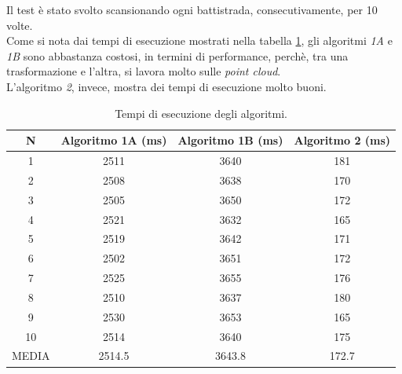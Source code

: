 \noindent Il test è stato svolto scansionando ogni battistrada, consecutivamente, per 10 volte.\\
\newline
Come si nota dai tempi di esecuzione mostrati nella tabella  \ref{table:tempo_algoritmi}, gli algoritmi \textit{1A} e \textit{1B} sono abbastanza costosi, in termini di performance, perchè, tra una trasformazione e l'altra, si lavora molto sulle \textit{point cloud}.\\
L'algoritmo \textit{2}, invece, mostra dei tempi di esecuzione molto buoni.\\

\begin{table}[h!]
\centering
\begin{tabular}{||c c c c||} 
 \hline
 N & Algoritmo 1A (ms) & Algoritmo 1B (ms) & Algoritmo 2 (ms) \\ [0.5ex]
 \hline\hline
 1 & 2511 & 3640 & 181 \\
 \hline
 2 & 2508 & 3638 & 170 \\
 \hline
 3 & 2505 & 3650 & 172 \\
 \hline
 4 & 2521 & 3632 & 165 \\
 \hline
 5 & 2519 & 3642 & 171 \\
 \hline
 6 & 2502 & 3651 & 172 \\
 \hline
 7 & 2525 & 3655 & 176 \\
 \hline
 8 & 2510 & 3637 & 180 \\
 \hline
 9 & 2530 & 3653 & 165 \\
 \hline
 10 & 2514 & 3640 & 175 \\ [0.5ex]
 \hline\hline
 MEDIA & 2514.5 & 3643.8 & 172.7 \\
 \hline
\end{tabular}
\caption{Tempi di esecuzione degli algoritmi.}
\label{table:tempo_algoritmi}
\end{table}